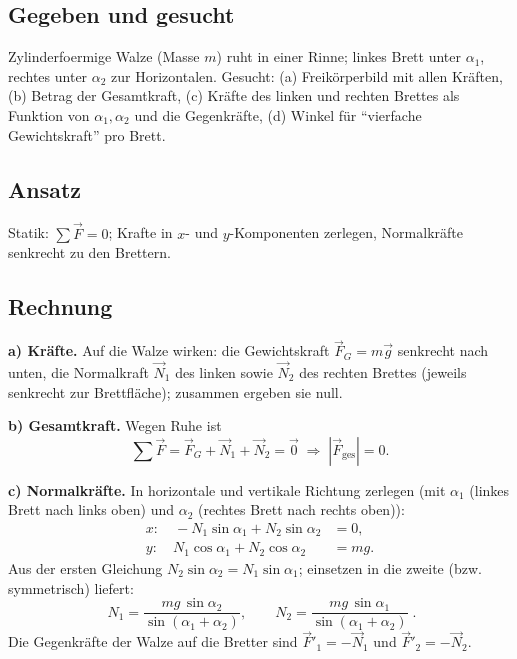 
\subsection*{Gegeben und gesucht}
Zylinderfoermige Walze (Masse $m$) ruht in einer Rinne; linkes Brett
unter $\alpha_1$, rechtes unter $\alpha_2$ zur Horizontalen.
Gesucht: (a) Freikörperbild mit allen Kräften, (b) Betrag der
Gesamtkraft, (c) Kräfte des linken und rechten Brettes als Funktion von
$\alpha_1,\alpha_2$ und die Gegenkräfte, (d) Winkel für
``vierfache Gewichtskraft'' pro Brett.

\subsection*{Ansatz}
Statik: $\sum\vec F=0$; Krafte in $x$- und $y$-Komponenten zerlegen,
Normalkräfte senkrecht zu den Brettern.

\subsection*{Rechnung}
\textbf{a) Kräfte.} Auf die Walze wirken: die Gewichtskraft
$\vec F_G=m\vec g$ senkrecht nach unten, die Normalkraft $\vec N_1$ des
linken sowie $\vec N_2$ des rechten Brettes (jeweils senkrecht zur
Brettfläche); zusammen ergeben sie null.

\textbf{b) Gesamtkraft.} Wegen Ruhe ist
\begin{equation}
  \sum\vec F=\vec F_G+\vec N_1+\vec N_2=\vec 0
  \;\Rightarrow\;|\vec F_{\mathrm{ges}}|=0.
\end{equation}

\textbf{c) Normalkräfte.} In horizontale und vertikale Richtung zerlegen
(mit $\alpha_1$ (linkes Brett nach links oben) und $\alpha_2$
(rechtes Brett nach rechts oben)):
\begin{align}
  x:\quad -N_1\sin\alpha_1+N_2\sin\alpha_2&=0,\\
  y:\quad N_1\cos\alpha_1+N_2\cos\alpha_2&=mg.
\end{align}
Aus der ersten Gleichung $N_2\sin\alpha_2=N_1\sin\alpha_1$;
einsetzen in die zweite (bzw. symmetrisch) liefert:
\begin{equation}
  \boxed{\;N_1=\frac{mg\,\sin\alpha_2}{\sin(\alpha_1+\alpha_2)},\qquad
  N_2=\frac{mg\,\sin\alpha_1}{\sin(\alpha_1+\alpha_2)}\;}.
\end{equation}
Die Gegenkräfte der Walze auf die Bretter sind
$\vec F'_1=-\vec N_1$ und $\vec F'_2=-\vec N_2$.


